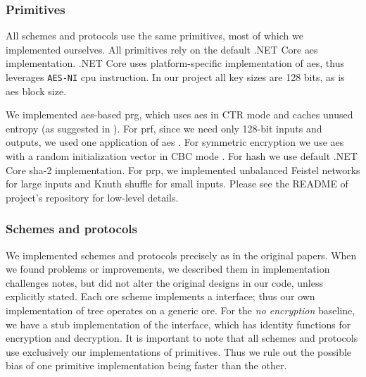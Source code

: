 		\subsubsection{Primitives}

			All schemes and protocols use the same primitives, most of which we implemented ourselves.
			All primitives rely on the default {.NET Core} \acrshort{aes} implementation.
			{.NET Core} uses platform-specific implementation of \acrshort{aes}, thus leverages \texttt{AES-NI} \acrshort{cpu} instruction.
			In our project all key sizes are 128 bits, as is \acrshort{aes} block size.

			We implemented \acrshort{aes}-based \acrshort{prg}, which uses \acrshort{aes} \cite{aes-nist} in CTR mode \cite{nist-modes} and caches unused entropy (as suggested in \cite{aes-ctr-rfc}).
			For \acrshort{prf}, since we need only 128-bit inputs and outputs, we used one application of \acrshort{aes} \cite[Proposition 3.27]{intro-to-modern-crypto}.
			For symmetric encryption we use \acrshort{aes} with a random initialization vector in CBC mode \cite[Section 3.6.2]{intro-to-modern-crypto}.
			For hash we use default {.NET Core} \acrshort{sha}-2 implementation.
			For \acrshort{prp}, we implemented unbalanced Feistel networks \cite{unbalanced-feistel} for large inputs and Knuth shuffle \cite{knuth-shuffle} for small inputs.
			Please see the README of project's repository \cite{ore-project} for low-level details.

		\subsubsection{Schemes and protocols}

			We implemented schemes and protocols precisely as in the original papers.
			When we found problems or improvements, we described them in implementation challenges notes, but did not alter the original designs in our code, unless explicitly stated.
			Each \acrshort{ore} scheme implements a {\Csharp} interface; thus our own implementation of {\BPlus} tree operates on a generic \acrshort{ore}.
			For the \emph{no encryption} baseline, we have a stub implementation of the interface, which has identity functions for encryption and decryption.
			It is important to note that all schemes and protocols use exclusively our implementations of primitives.
			Thus we rule out the possible bias of one primitive implementation being faster than the other.

			

